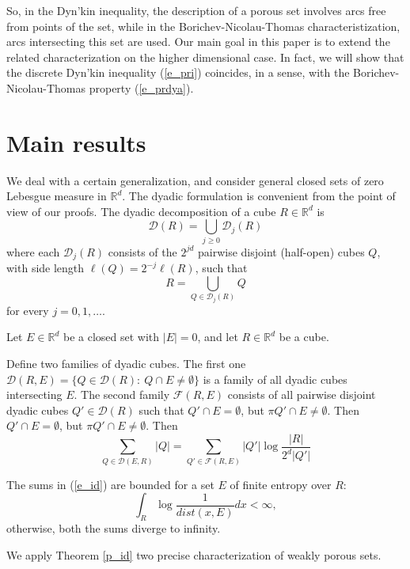 \documentclass[12pt]{llncs}
\begin{document}
So, in  the Dyn'kin inequality, the description of a porous set involves arcs free from points of the set, while in the Borichev-Nicolau-Thomas characteristization,  arcs intersecting this set are used.
Our main goal in this paper is to extend   the related characterization  
on the higher dimensional case. 
In fact, we will show that the  discrete  Dyn'kin inequality (\ref{e_pri}) coincides, in a sense, with   the
Borichev-Nicolau-Thomas property (\ref{e_prdya}).

\section{Main results}
We deal  with a certain generalization, and consider  general closed sets of zero Lebesgue measure  in $\mathbb{R}^d$.
The dyadic formulation is convenient from the point of view of our
proofs. 
The dyadic decomposition of a cube $R\in \mathbb{R}^d $ is
\[ \mathcal{D}(R)= \bigcup_{j\geq 0} \mathcal{D}_j(R)\]
where each $\mathcal{D}_j(R)$ consists of the $2^{jd}$  pairwise disjoint (half-open) cubes $Q$, with side length
$\ell(Q) = 2^{-j}\ell(R)$, such that
\[R= \bigcup_{Q \in \mathcal{D}_j(R)} Q\]
for every $j =0,1, \dots $.

\begin{theorem}\label{p_id}
  Let $E \in \mathbb{R}^d$ be a closed set with $|E|=0$, and let $R \in \mathbb{R}^d$ be a cube.

  Define two families of dyadic cubes.
      The first one   $\mathcal{D}(R,E)=\{Q \in \mathcal{D}(R): \:  Q \cap E \neq \emptyset\}$ is a family of all dyadic cubes intersecting $E$.
    The second family
  $\mathcal{F}(R,E)$  consists of all  pairwise disjoint dyadic cubes $Q' \in \mathcal{D}(R)$  such that
  $Q'\cap E=\emptyset$, but $\pi Q'\cap E \neq \emptyset$. Then
   $Q'\cap E=\emptyset$, but $\pi Q'\cap E \neq \emptyset$. Then
 \begin{equation}\label{e_id}
 \sum_{Q \in \mathcal{D}(E,R)}|Q|
 = \sum_ {Q'\in \mathcal{F}(R,E) }|Q'|\log \frac{|R|}{2^d|Q'|}
\end{equation}
\end{theorem}

\begin{remark}
  The sums in (\ref{e_id}) are bounded for  a set  $E$  of finite entropy over $R$:
  \[\int_{R}\log\frac{1}{dist(x, E)}dx < \infty,\]
  otherwise, both the sums diverge to  infinity.
\end{remark}
We apply  Theorem \ref{p_id}  two precise characterization of    weakly porous sets.
\end{document}
